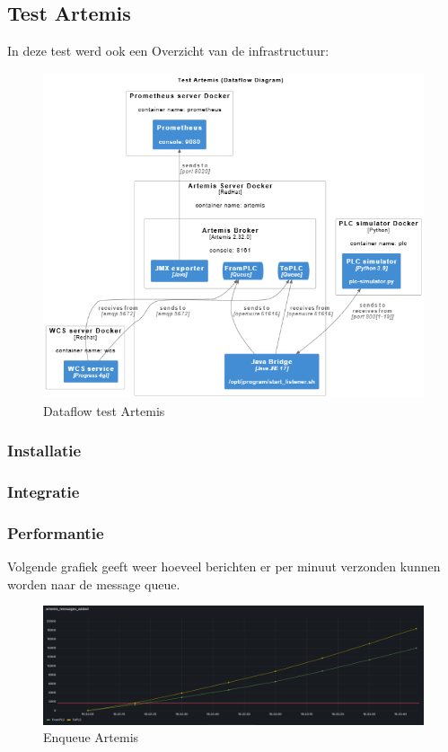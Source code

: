 \subsection{Test Artemis}
In deze test werd ook een 
Overzicht van de infrastructuur:
\begin{figure}[h!]
  \centering
  \includegraphics[width=.95\textwidth]{img/test-artemis-dataflow.png}
  \caption{\label{fig:test_artemis_dataflow}Dataflow test Artemis}
\end{figure}

\subsubsection{Installatie}
 
\subsubsection{Integratie}

\subsubsection{Performantie}
Volgende grafiek geeft weer hoeveel berichten er per minuut verzonden kunnen worden naar de message queue.
\begin{figure}[h!]
  \centering
  \includegraphics[width=.95\textwidth]{img/artemis-enqueue-count.png}
  \caption{\label{fig:artemis_enqueue_count}Enqueue Artemis}
\end{figure}


